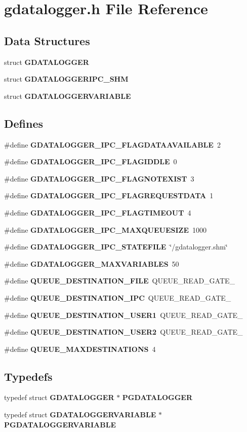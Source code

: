 \section{gdatalogger.h File Reference}
\label{gdatalogger_8h}
\subsection*{Data Structures}
\begin{DoxyCompactItemize}
\item 
struct {\bf GDATALOGGER}
\item 
struct {\bf GDATALOGGERIPC\_\-SHM}
\item 
struct {\bf GDATALOGGERVARIABLE}
\end{DoxyCompactItemize}
\subsection*{Defines}
\begin{DoxyCompactItemize}
\item 
\#define {\bf GDATALOGGER\_\-IPC\_\-FLAGDATAAVAILABLE}~2
\item 
\#define {\bf GDATALOGGER\_\-IPC\_\-FLAGIDDLE}~0
\item 
\#define {\bf GDATALOGGER\_\-IPC\_\-FLAGNOTEXIST}~3
\item 
\#define {\bf GDATALOGGER\_\-IPC\_\-FLAGREQUESTDATA}~1
\item 
\#define {\bf GDATALOGGER\_\-IPC\_\-FLAGTIMEOUT}~4
\item 
\#define {\bf GDATALOGGER\_\-IPC\_\-MAXQUEUESIZE}~1000
\item 
\#define {\bf GDATALOGGER\_\-IPC\_\-STATEFILE}~\char`\"{}/gdatalogger.shm\char`\"{}
\item 
\#define {\bf GDATALOGGER\_\-MAXVARIABLES}~50
\item 
\#define {\bf QUEUE\_\-DESTINATION\_\-FILE}~QUEUE\_\-READ\_\-GATE\_
\item 
\#define {\bf QUEUE\_\-DESTINATION\_\-IPC}~QUEUE\_\-READ\_\-GATE\_
\item 
\#define {\bf QUEUE\_\-DESTINATION\_\-USER1}~QUEUE\_\-READ\_\-GATE\_
\item 
\#define {\bf QUEUE\_\-DESTINATION\_\-USER2}~QUEUE\_\-READ\_\-GATE\_
\item 
\#define {\bf QUEUE\_\-MAXDESTINATIONS}~4
\end{DoxyCompactItemize}
\subsection*{Typedefs}
\begin{DoxyCompactItemize}
\item 
typedef struct {\bf GDATALOGGER} $\ast$ {\bf PGDATALOGGER}
\item 
typedef struct {\bf GDATALOGGERVARIABLE} $\ast$ {\bf PGDATALOGGERVARIABLE}
\end{DoxyCompactItemize}
